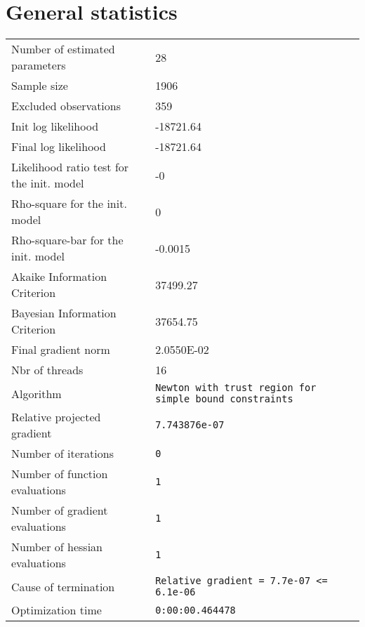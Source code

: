 



\section{General statistics}
\begin{tabular}{ll}
Number of estimated parameters & 28 \\
Sample size & 1906 \\
Excluded observations & 359 \\
Init log likelihood & -18721.64 \\
Final log likelihood & -18721.64 \\
Likelihood ratio test for the init. model & -0 \\
Rho-square for the init. model & 0 \\
Rho-square-bar for the init. model & -0.0015 \\
Akaike Information Criterion & 37499.27 \\
Bayesian Information Criterion & 37654.75 \\
Final gradient norm & 2.0550E-02 \\
Nbr of threads & 16 \\
Algorithm & \verb$Newton with trust region for simple bound constraints$ \\
Relative projected gradient & \verb$7.743876e-07$ \\
Number of iterations & \verb$0$ \\
Number of function evaluations & \verb$1$ \\
Number of gradient evaluations & \verb$1$ \\
Number of hessian evaluations & \verb$1$ \\
Cause of termination & \verb$Relative gradient = 7.7e-07 <= 6.1e-06$ \\
Optimization time & \verb$0:00:00.464478$ \\
\end{tabular}

